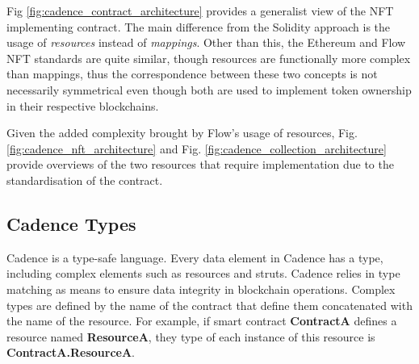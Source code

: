 \documentclass[../main.tex]{subfiles}
\begin{document}
Fig \ref{fig:cadence_contract_architecture} provides a generalist view of the NFT implementing contract. The main difference from the Solidity approach is the usage of \textit{resources} instead of \textit{mappings}. Other than this, the Ethereum and Flow NFT standards are quite similar, though resources are functionally more complex than mappings, thus the correspondence between these two concepts is not necessarily symmetrical even though both are used to implement token ownership in their respective blockchains.
\par
Given the added complexity brought by Flow's usage of resources, Fig. \ref{fig:cadence_nft_architecture} and Fig. \ref{fig:cadence_collection_architecture} provide overviews of the two resources that require implementation due to the standardisation of the contract.

\subsection{Cadence Types}
\label{sec:cadence_types}
Cadence is a type-safe language. Every data element in Cadence has a type, including complex elements such as resources and struts. Cadence relies in type matching as means to ensure data integrity in blockchain operations. Complex types are defined by the name of the contract that define them concatenated with the name of the resource. For example, if smart contract \textbf{ContractA} defines a resource named \textbf{ResourceA}, they type of each instance of this resource is \textbf{ContractA.ResourceA}.
\end{document}
